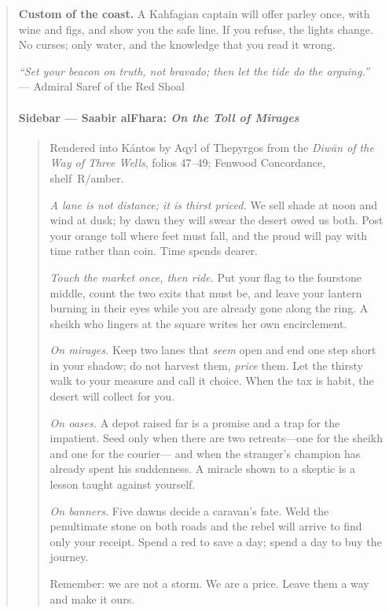 \documentclass[11pt]{article}
\begin{document}
\begin{quote}
\medskip
\noindent\textbf{Custom of the coast.} A Kahfagian captain will offer parley once, with wine and figs, and show you the safe line. If you refuse, the lights change. No curses; only water, and the knowledge that you read it wrong.

\medskip
\noindent\textit{“Set your beacon on truth, not bravado; then let the tide do the arguing.”} — Admiral Saref of the Red Shoal

\clearpage

\paragraph*{Sidebar — Saabir al\textendash Fhara: \textit{On the Toll of Mirages}}
\begin{quote}\small
Rendered into Kántos by Aqyl of Thepyrgos from the \textit{Diwān of the Way of Three Wells}, folios 47–49; Fenwood Concordance, shelf~R/amber.

\medskip
\textit{A lane is not distance; it is thirst priced.} We sell shade at noon and wind at dusk; by dawn they will swear the desert owed us both. Post your orange toll where feet must fall, and the proud will pay with time rather than coin. Time spends dearer.

\medskip
\textit{Touch the market once, then ride.} Put your flag to the four\textendash stone middle, count the two exits that must be, and leave your lantern burning in their eyes while you are already gone along the ring. A sheikh who lingers at the square writes her own encirclement.

\medskip
\textit{On mirages.} Keep two lanes that \emph{seem} open and end one step short in your shadow; do not harvest them, \emph{price} them. Let the thirsty walk to your measure and call it choice. When the tax is habit, the desert will collect for you.

\medskip
\textit{On oases.} A depot raised far is a promise and a trap for the impatient. Seed only when there are two retreats—one for the sheikh and one for the courier— and when the stranger’s champion has already spent his suddenness. A miracle shown to a skeptic is a lesson taught against yourself.

\medskip
\textit{On banners.} Five dawns decide a caravan’s fate. Weld the penultimate stone on both roads and the rebel will arrive to find only your receipt. Spend a red to save a day; spend a day to buy the journey.

\medskip
Remember: we are not a storm. We are a price. Leave them a way and make it ours.
\end{quote}


\end{quote}
\end{document}
